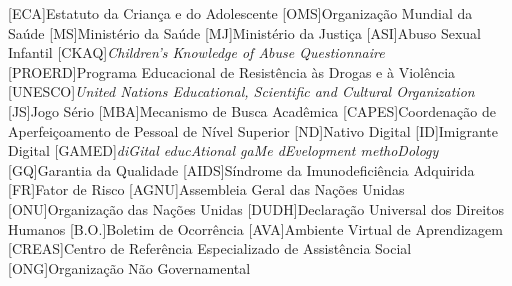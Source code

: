 
\listoffigures*
\cleardoublepage



\listoftables*
\cleardoublepage

\begin{siglas}
	\begin{acronym}[labelsep=1.5cm]
		\setlength{\itemindent}{1em}
		[ECA]{{Estatuto da Criança e do Adolescente}}
		[OMS]{{Organização Mundial da Saúde}} 
		[MS]{{Ministério da Saúde}} 
		[MJ]{{Ministério da Justiça}}
		[ASI]{{Abuso Sexual Infantil}} 
		{\textit{Children’s Knowledge of Abuse Questionnaire}}
		[PROERD]{{Programa Educacional de Resistência às Drogas e à Violência}}
		[UNESCO]{\textit{United Nations Educational, Scientific and Cultural Organization}}
		[JS]{{Jogo Sério}}
		[MBA]{{Mecanismo de Busca Acadêmica}}
		[CAPES]{{Coordenação de Aperfeiçoamento de Pessoal de Nível Superior}}
		[ND]{{Nativo Digital}}
		[ID]{{Imigrante Digital}}
		[GAMED]{\textit{diGital educAtional gaMe dEvelopment methoDology}}
		[GQ]{{Garantia da Qualidade}}
		{{Síndrome da Imunodeficiência Adquirida}}
		[FR]{{Fator de Risco}}
		{{Assembleia Geral das Nações Unidas}}
		[ONU]{{Organização das Nações Unidas}}
		{{Declaração Universal dos Direitos Humanos}}
		{{Boletim de Ocorrência}}
		[AVA]{{Ambiente Virtual de Aprendizagem}}
		[CREAS]{{Centro de Referência Especializado de Assistência Social}}
		[ONG]{{Organização Não Governamental}}

\end{acronym}
\end{siglas}
